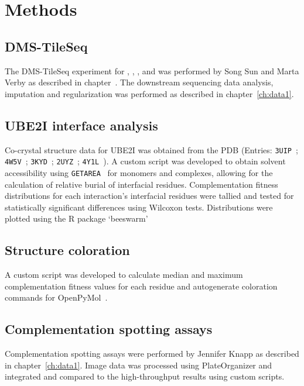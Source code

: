 \section{Methods}

\subsection{DMS-TileSeq}
The DMS-TileSeq experiment for , , , and  was performed by Song Sun and Marta Verby as described in chapter~\cite{ch:data1}. The downstream sequencing data analysis, imputation and regularization was performed as described in chapter~\ref{ch:data1}.

\subsection{UBE2I interface analysis}
Co-crystal structure data for UBE2I was obtained from the PDB (Entries: \texttt{3UIP}~\cite{gareau_determinants_2012}; \texttt{4W5V}~\cite{reiter_characterization_2016}; \texttt{3KYD}~\cite{olsen_active_2010}; \texttt{2UYZ}~\cite{knipscheer_noncovalent_2007}; \texttt{4Y1L}~\cite{alontaga_rwd_2015}). A custom script was developed to obtain solvent accessibility using \texttt{GETAREA}~\cite{fraczkiewicz_exact_1998} for monomers and complexes, allowing for the calculation of relative burial of interfacial residues. Complementation fitness distributions for each interaction's interfacial residues were tallied and tested for statistically significant differences using Wilcoxon tests. Distributions were plotted using the R package `beeswarm'~\cite{eklund_bee_2016}

\subsection{Structure coloration} A custom script was developed to calculate median and maximum complementation fitness values for each residue and autogenerate coloration commands for OpenPyMol~\cite{schrodinger_pymol_2016}. 

\subsection{Complementation spotting assays} Complementation spotting assays were performed by Jennifer Knapp as described in chapter~\ref{ch:data1}. Image data was processed using PlateOrganizer and integrated and compared to the high-throughput results using custom scripts.

